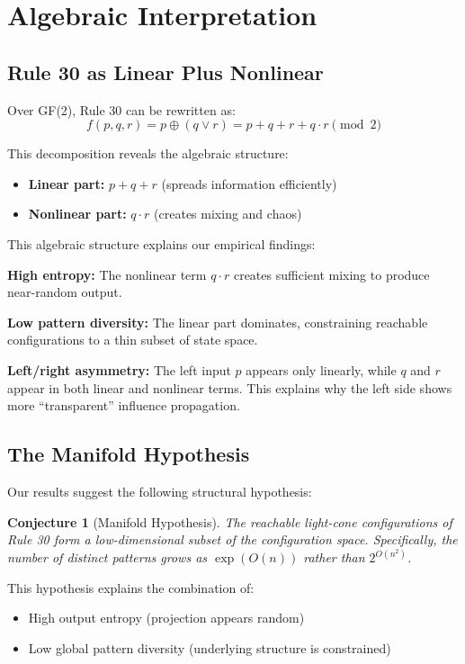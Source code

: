 \documentclass[11pt]{article}
\newtheorem{conjecture}[theorem]{Conjecture}
\begin{document}
\section{Algebraic Interpretation}

\subsection{Rule 30 as Linear Plus Nonlinear}

Over GF(2), Rule 30 can be rewritten as:
\begin{equation}
f(p,q,r) = p \oplus (q \lor r) = p + q + r + q \cdot r \pmod{2}
\end{equation}

This decomposition reveals the algebraic structure:
\begin{itemize}
    \item \textbf{Linear part:} $p + q + r$ (spreads information efficiently)
    \item \textbf{Nonlinear part:} $q \cdot r$ (creates mixing and chaos)
\end{itemize}

This algebraic structure explains our empirical findings:

\textbf{High entropy:} The nonlinear term $q \cdot r$ creates sufficient mixing to produce near-random output.

\textbf{Low pattern diversity:} The linear part dominates, constraining reachable configurations to a thin subset of state space.

\textbf{Left/right asymmetry:} The left input $p$ appears only linearly, while $q$ and $r$ appear in both linear and nonlinear terms. This explains why the left side shows more ``transparent'' influence propagation.

\subsection{The Manifold Hypothesis}

Our results suggest the following structural hypothesis:

\begin{conjecture}[Manifold Hypothesis]
The reachable light-cone configurations of Rule 30 form a low-dimensional subset of the configuration space. Specifically, the number of distinct patterns grows as $\exp(O(n))$ rather than $2^{O(n^2)}$.
\end{conjecture}

This hypothesis explains the combination of:
\begin{itemize}
    \item High output entropy (projection appears random)
    \item Low global pattern diversity (underlying structure is constrained)
\end{itemize}
\end{document}

